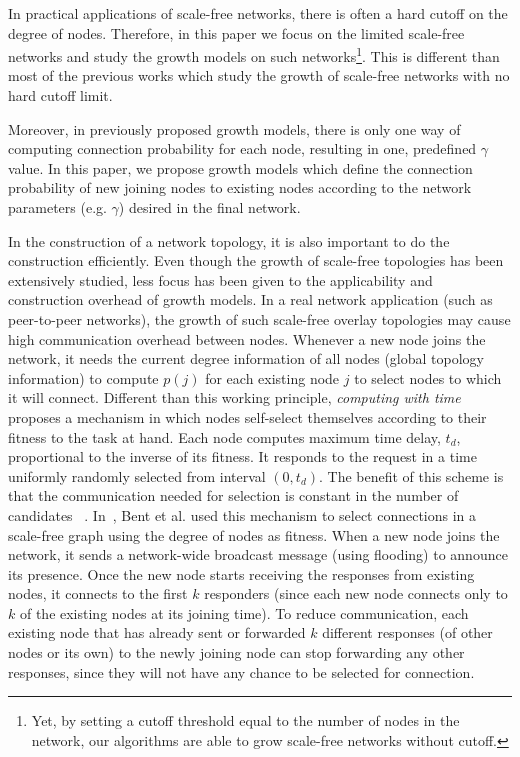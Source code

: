 \documentclass[10pt,journal,cspaper,compsoc]{IEEEtran}
\begin{document}
In practical applications of scale-free networks, there is often a hard cutoff on the degree of nodes. Therefore, in this paper we focus on the limited scale-free networks and study the growth models on such networks\footnote{Yet, by setting a cutoff threshold equal to the number of nodes in the network, our algorithms are able to grow scale-free networks without cutoff.}. This is different than most of the previous works which study the growth of scale-free networks with no hard cutoff limit.

Moreover, in previously proposed growth models, there is only one way of computing connection probability for each node, resulting in one, predefined $\gamma$ value. In this paper, we propose growth models which define the connection probability of new joining nodes to existing nodes according to the network parameters (e.g. $\gamma$) desired in the final network.

In the construction of a network topology, it is also important to do the construction efficiently. Even though the growth of scale-free topologies has been extensively studied, less focus has been given to the applicability and construction overhead of growth models. In a real network application (such as peer-to-peer networks), the growth of such scale-free overlay topologies may cause high communication overhead between nodes. Whenever a new node joins the network, it needs the current degree information of all nodes (global topology information) to compute $p(j)$ for each existing node $j$ to select nodes to which it will connect. 
Different than this working principle, {\it computing with time} ~\cite{computer-bks} proposes a mechanism in which nodes self-select themselves according to their fitness to the task at hand. Each node computes maximum time delay, $t_d$, proportional to the inverse of its fitness. It responds to the request in a time uniformly randomly selected from interval $(0,t_d)$. The benefit of this scheme is that the communication needed for selection is constant in the number of candidates ~\cite{computer-bks}. In~\cite{gaian-dynamic}, Bent et al. used this mechanism to select connections in a scale-free graph using the degree of nodes as fitness. When a new node joins the network, it sends a network-wide broadcast message (using flooding) to announce its presence. Once the new node starts receiving the responses from existing nodes, it connects to the first $k$ responders (since each new node connects only to $k$ of the existing nodes at its joining time). To reduce communication, each existing node that has already sent or forwarded $k$ different responses (of other nodes or its own) to the newly joining node can stop forwarding any other responses, since they will not have any chance to be selected for connection. 
\end{document}

